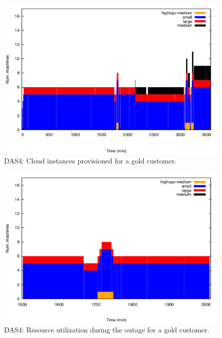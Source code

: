 \begin{figure}
  \begin{center}
    \includegraphics[width=.85\linewidth]{images/exps2011/high/das/inst_type_machines.pdf}
  \end{center}
\vspace{-5mm}
  \caption{DAS4: Cloud instances provisioned for a gold customer.}
  \label{highInstances}
\end{figure}

\begin{figure}
  \begin{center}
    \includegraphics[width=.85\linewidth]{images/exps2011/high/das/inst_type_machines_filtered.pdf}
  \end{center}
\vspace{-5mm}
  \caption{DAS4: Resource utilization during the outage for a gold customer.}
  \label{resOutage}
\end{figure}

